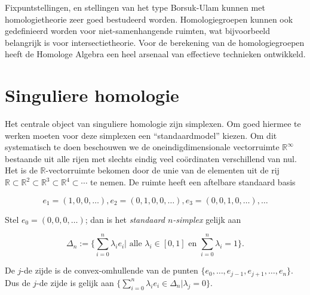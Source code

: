 \documentclass[12pt]{book}
\newcommand{\R}{\mathbb{R}}
\begin{document}
Fixpuntstellingen,  en stellingen van het type Borsuk-Ulam kunnen met homologietheorie zeer goed bestudeerd worden. Homologiegroepen  kunnen ook gedefinieerd worden voor niet-samenhangende ruimten, wat bijvoorbeeld belangrijk is voor intersectietheorie. Voor de berekening van de homologiegroepen heeft de Homologe Algebra een heel arsenaal van effectieve technieken ontwikkeld. 


\section{Singuliere homologie}

Het centrale object van singuliere homologie zijn simplexen. Om goed hiermee te werken moeten voor deze simplexen een ``standaardmodel'' kiezen. Om dit systematisch te doen beschouwen we de oneindigdimensionale vectorruimte $\R^{\infty}$ bestaande uit alle rijen met slechts eindig veel co\"ordinaten verschillend van nul. Het is de $\R$-vectorruimte bekomen door de unie van de elementen uit de rij $\R\subset \R^2 \subset \R^3 \subset \R^4 \subset \cdots$ te nemen. De ruimte heeft een aftelbare standaard basis

$$e_1=(1,0,0, \ldots ), e_2=(0,1,0,0, \ldots) ,e_3=(0,0,1,0 ,\ldots), \ldots$$

Stel $e_0=(0,0,0, \ldots)$; dan is het {\em standaard $n$-simplex} gelijk aan 

$$\Delta_n:=\{\sum_{i=0}^{n}\lambda_i e_i|\mbox{ alle } \lambda_i\in [0,1] \mbox{ en } \sum_{i=0}^{n}\lambda_i=1\}.$$

De $j$-de zijde is de convex-omhullende van de punten $\{e_0, \ldots , e_{j-1}, e_{j+1}, \ldots , e_n\}$. Dus de $j$-de zijde is gelijk aan
$\{\sum_{i=0}^{n}\lambda_i e_i\in \Delta_n|\lambda_j=0\}$.
\end{document}
